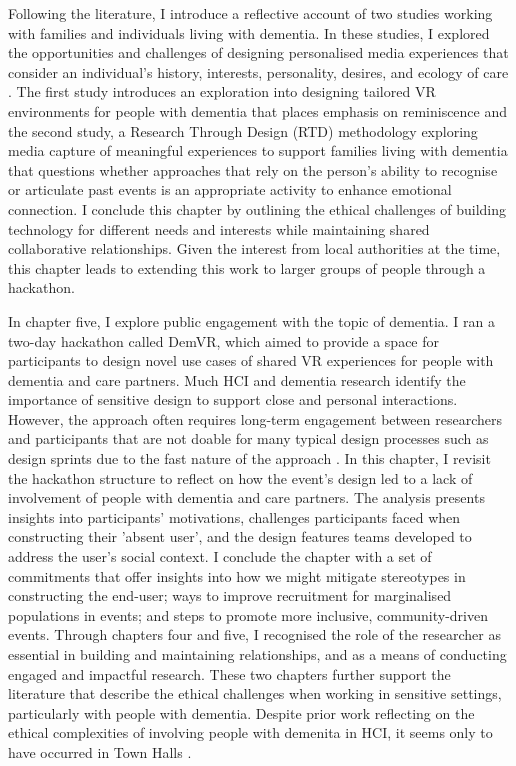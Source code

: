 Following the literature, I introduce a reflective account of two studies working with families and individuals living with dementia. In these studies, I explored the opportunities and challenges of designing personalised media experiences that consider an individual's history, interests, personality, desires, and ecology of care \citep{ryan_dementia_2009}. The first study introduces an exploration into designing tailored VR environments for people with dementia that places emphasis on reminiscence and the second study, a Research Through Design (RTD) methodology exploring media capture of meaningful experiences to support families living with dementia that questions whether approaches that rely on the person's ability to recognise or articulate past events is an appropriate activity to enhance emotional connection. I conclude this chapter by outlining the ethical challenges of building technology for different needs and interests while maintaining shared collaborative relationships. Given the interest from local authorities at the time, this chapter leads to extending this work to larger groups of people through a hackathon.

In chapter five, I explore public engagement with the topic of dementia. I ran a two-day hackathon called DemVR, which aimed to provide a space for participants to design novel use cases of shared VR experiences for people with dementia and care partners. Much HCI and dementia research identify the importance of sensitive design to support close and personal interactions. However, the approach often requires long-term engagement between researchers and participants that are not doable for many typical design processes such as design sprints due to the fast nature of the approach \citep{braybrooke2021care}. In this chapter, I revisit the hackathon structure to reflect on how the event's design led to a lack of involvement of people with dementia and care partners. The analysis presents insights into participants' motivations, challenges participants faced when constructing their 'absent user', and the design features teams developed to address the user's social context. I conclude the chapter with a set of commitments that offer insights into how we might mitigate stereotypes in constructing the end-user; ways to improve recruitment for marginalised populations in events; and steps to promote more inclusive, community-driven events. Through chapters four and five, I recognised the role of the researcher as essential in building and maintaining relationships, and as a means of conducting engaged and impactful research. These two chapters further support the literature that describe the ethical challenges when working in sensitive settings, particularly with people with dementia. Despite prior work reflecting on the ethical complexities of involving people with demenita in HCI, it seems only to have occurred in Town Halls \citep{frauenberger_research_2017}. 

